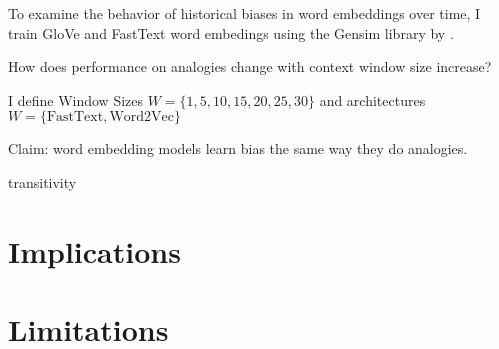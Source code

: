 \documentclass[11pt,a4paper]{article}
\begin{document}
To examine the behavior of historical biases in word embeddings over time, I train GloVe and FastText word embedings using the Gensim library by \citet{rehurek_lrec}. 


How does performance on analogies change with context window size increase?

I define Window Sizes $W = \{1,5,10,15,20, 25, 30\}$ and architectures $W = \{\text{FastText}, \text{Word2Vec} \}$

Claim: word embedding models learn bias the same way they do analogies.

transitivity 

\section{Implications}

\section{Limitations}






\end{document}
